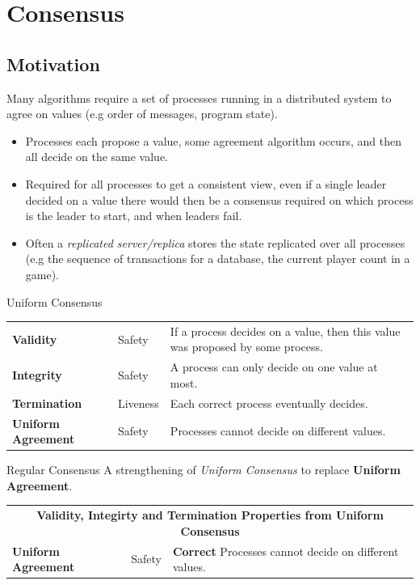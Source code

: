 \chapter{Consensus}
\section{Motivation}
Many algorithms require a set of processes running in a distributed system to agree on values (e.g order of messages, program state).
\begin{itemize}
    \item Processes each propose a value, some agreement algorithm occurs, and then all decide on the same value.
    \item Required for all processes to get a consistent view, even if a single leader decided on a value there would then be a consensus required on which process is the leader to start, and when leaders fail.
    \item Often a \textit{replicated server/replica} stores the state replicated over all processes (e.g the sequence of transactions for a database, the current player count in a game).
\end{itemize}

\begin{definitionbox}{Uniform Consensus}
    \begin{center}
        \begin{tabular}{l l p{}}
            \textbf{Validity} & Safety & If a process decides on a value, then this value was proposed by some process. \\
            \textbf{Integrity} & Safety & A process can only decide on one value at most. \\
            \textbf{Termination} & Liveness & Each correct process eventually decides. \\
            \textbf{Uniform Agreement} & Safety & Processes cannot decide on different values. \\
        \end{tabular}
    \end{center}
\end{definitionbox}

\begin{definitionbox}{Regular Consensus}
    A strengthening of \textit{Uniform Consensus} to replace \textbf{Uniform Agreement}.
    \begin{center}
        \begin{tabular}{l l p{}}
            \multicolumn{3}{c}{\textbf{Validity, Integirty and Termination Properties from Uniform Consensus}} \\
            \textbf{Uniform Agreement} & Safety & \textbf{Correct} Processes cannot decide on different values. \\
        \end{tabular}
    \end{center}
\end{definitionbox}

